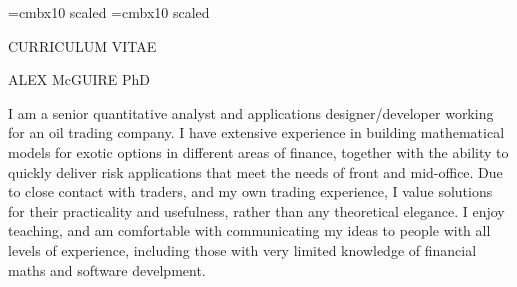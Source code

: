 \font\titlesize=cmbx10 scaled
\font\namesize=cmbx10 scaled
\vsize=10in
\hsize=8in
\voffset -0.4in
\hoffset -0.9in
\vskip 1cm
\centerline{\titlesize CURRICULUM VITAE}
\vskip 0.4in
\centerline{\namesize ALEX McGUIRE PhD}
\vskip 0.2in
\def\jobskip{\noalign{\bigskip}}
\def\posskip{\noalign{\medskip}}
\midinsert
\narrower\narrower\narrower
\noindent I am a senior quantitative analyst and applications designer/developer working for an oil trading company. I have extensive experience in building mathematical models for exotic options in 
different areas of finance, together with the ability to quickly deliver risk applications that meet the needs of front and mid-office. Due to close contact with traders, and my own trading experience, I value
solutions for their practicality and usefulness, rather than any theoretical elegance. I enjoy teaching, and am comfortable with communicating my ideas to people with all
levels of experience, including those with very limited knowledge of financial maths and software develpment.
\endinsert


